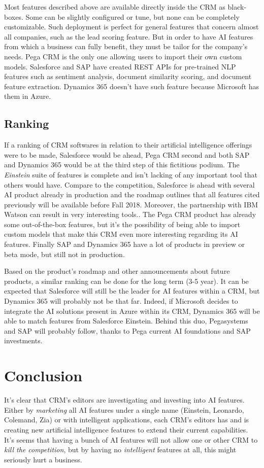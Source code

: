 Most features described above are available directly inside the CRM as black-boxes. Some can be slightly configured or tune, but none can be completely customizable. Such deployment is perfect for general features that concern almost all companies, such as the lead scoring feature. But in order to have AI features from which a business can fully benefit, they must be tailor for the company's needs. Pega CRM is the only one allowing users to import their own custom models. Salesforce and SAP have created REST APIs for pre-trained NLP features such as sentiment analysis, document similarity scoring, and document feature extraction. Dynamics 365 doesn't have such feature because Microsoft has them in Azure.


\subsection{Ranking}
If a ranking of CRM softwares in relation to their artificial intelligence offerings were to be made, Salesforce would be ahead, Pega CRM second and both SAP and Dynamics 365 would be at the third step of this fictitious podium. The \textit{Einstein} suite of features is complete and isn't lacking of any important tool that others would have. Compare to the competition, Salesforce is ahead with several AI product already in production and the roadmap outlines that all features cited previously will be available before Fall 2018. Moreover, the partnership with IBM Watson can result in very interesting tools.. The Pega CRM product has already some out-of-the-box features, but it's the possibility of being able to import custom models that make this CRM even more interesting regarding its AI features. Finally SAP and Dynamics 365 have a lot of products in preview or beta mode, but still not in production. 

Based on the product's roadmap and other announcements about future products, a similar ranking can be done for the long term (3-5 year). It can be expected that Salesforce will still be the leader for AI features within a CRM, but Dynamics 365 will probably not be that far. Indeed, if Microsoft decides to integrate the AI solutions present in Azure within its CRM, Dynamics 365 will be able to match features from Salesforce Einstein. Behind this duo, Pegasystems and SAP will probably follow, thanks to Pega current AI foundations and SAP investments. 


\section{Conclusion}
It's clear that CRM's editors are investigating and investing into AI features. Either by \textit{marketing} all AI features under a single name (Einstein, Leonardo, Colemand, Zia) or with intelligent applications, each CRM's editors has and is creating new artificial intelligence features to extend their current capabilities. It's seems that having a bunch of AI features will not allow one or other CRM to \textit{kill the competition}, but by having no \textit{intelligent} features at all, this might seriously hurt a business.

